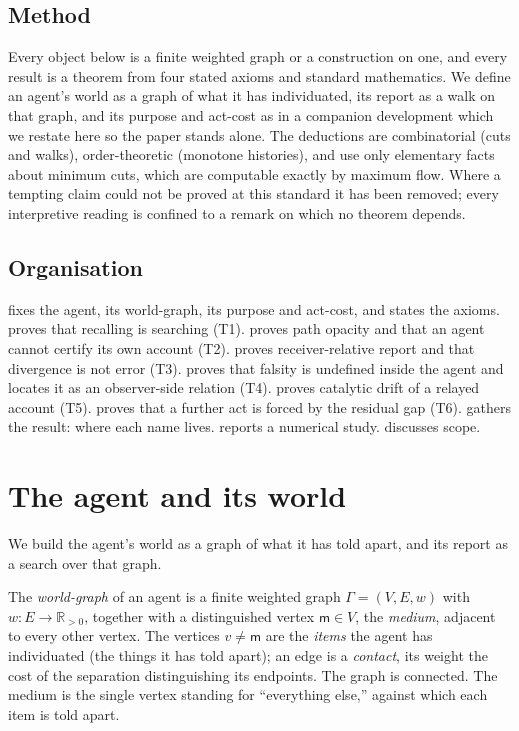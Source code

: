 \documentclass[11pt,twocolumn,a4paper]{article}
\newcommand{\R}{\mathbb{R}}
\newcommand{\Gph}{\Gamma}
\newcommand{\V}{V}
\newcommand{\E}{E}
\newcommand{\wt}{w}
\newcommand{\med}{\mathsf{m}}
\begin{document}
\subsection{Method}

Every object below is a finite weighted graph or a construction on one, and
every result is a theorem from four stated axioms and standard mathematics.
We define an agent's world as a graph of what it has individuated, its
report as a walk on that graph, and its purpose and act-cost as in a
companion development which we restate here so the paper stands alone. The
deductions are combinatorial (cuts and walks), order-theoretic (monotone
histories), and use only elementary facts about minimum cuts, which are
computable exactly by maximum flow. Where a tempting claim could not be
proved at this standard it has been removed; every interpretive reading is
confined to a remark on which no theorem depends.

\subsection{Organisation}

 fixes the agent, its world-graph, its purpose and
act-cost, and states the axioms.  proves that
recalling is searching (T1).  proves path opacity and
that an agent cannot certify its own account (T2). 
proves receiver-relative report and that divergence is not error (T3).
 proves that falsity is undefined inside the agent and
locates it as an observer-side relation (T4).  proves
catalytic drift of a relayed account (T5).  proves that a
further act is forced by the residual gap (T6). 
gathers the result: where each name lives.  reports a
numerical study.  discusses scope.

\section{The agent and its world}
\label{sec:world}

We build the agent's world as a graph of what it has told apart, and its
report as a search over that graph.

\begin{definition}
\label{def:world}
The \emph{world-graph} of an agent is a finite weighted graph
$\Gph=(\V,\E,\wt)$ with $\wt:\E\to\R_{>0}$, together with a distinguished
vertex $\med\in\V$, the \emph{medium}, adjacent to every other vertex. The
vertices $v\neq\med$ are the \emph{items} the agent has individuated (the
things it has told apart); an edge is a \emph{contact}, its weight the cost
of the separation distinguishing its endpoints. The graph is connected. The
medium is the single vertex standing for ``everything else,'' against which
each item is told apart.
\end{definition}
\end{document}
